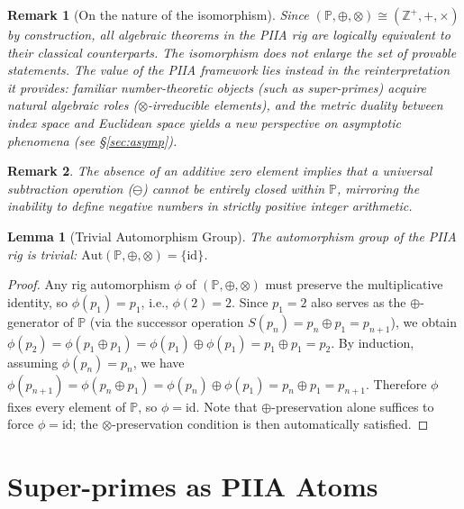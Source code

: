 \documentclass[11pt, a4paper]{article}
\newtheorem{lemma}{Lemma}
\newtheorem{remark}{Remark}
\begin{document}
\begin{remark}[On the nature of the isomorphism]\label{rem:transport}
Since $(\mathbb{P}, \oplus, \otimes) \cong (\mathbb{Z}^+, +, \times)$ by construction, all algebraic theorems in the PIIA rig are logically equivalent to their classical counterparts. The isomorphism does not enlarge the set of provable statements. The value of the PIIA framework lies instead in the \emph{reinterpretation} it provides: familiar number-theoretic objects (such as super-primes) acquire natural algebraic roles ($\otimes$-irreducible elements), and the \emph{metric duality} between index space and Euclidean space yields a new perspective on asymptotic phenomena (see \S\ref{sec:asymp}).
\end{remark}

\begin{remark}\label{rem:nosub}
The absence of an additive zero element implies that a universal subtraction operation ($\ominus$) cannot be entirely closed within $\mathbb{P}$, mirroring the inability to define negative numbers in strictly positive integer arithmetic.
\end{remark}

\begin{lemma}[Trivial Automorphism Group]\label{lem:aut}
The automorphism group of the PIIA rig is trivial: $\mathrm{Aut}(\mathbb{P}, \oplus, \otimes) = \{{\mathrm{id}}\}$.
\end{lemma}
\begin{proof}
Any rig automorphism $\phi$ of $(\mathbb{P}, \oplus, \otimes)$ must preserve the multiplicative identity, so $\phi(p_1) = p_1$, i.e., $\phi(2) = 2$. Since $p_1 = 2$ also serves as the $\oplus$-generator of $\mathbb{P}$ (via the successor operation $S(p_n) = p_n \oplus p_1 = p_{n+1}$), we obtain $\phi(p_2) = \phi(p_1 \oplus p_1) = \phi(p_1) \oplus \phi(p_1) = p_1 \oplus p_1 = p_2$. By induction, assuming $\phi(p_n) = p_n$, we have $\phi(p_{n+1}) = \phi(p_n \oplus p_1) = \phi(p_n) \oplus \phi(p_1) = p_n \oplus p_1 = p_{n+1}$. Therefore $\phi$ fixes every element of $\mathbb{P}$, so $\phi = \mathrm{id}$. Note that $\oplus$-preservation alone suffices to force $\phi = \mathrm{id}$; the $\otimes$-preservation condition is then automatically satisfied.
\end{proof}

\section{Super-primes as PIIA Atoms}\label{sec:superp}
\end{document}
